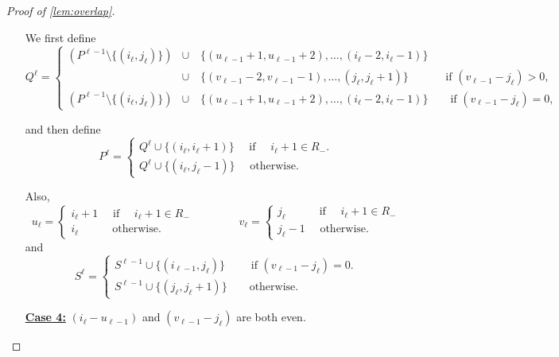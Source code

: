 \documentclass{article}
\begin{document}
\begin{proof}[Proof of \autoref{lem:overlap}]
\begin{enumerate}
        We first define
        \[
            Q^\ell = \begin{cases}
                (P^{\ell-1} \setminus \{(i_\ell, j_\ell)\}) &\cup \quad \{(u_{\ell-1}+1, u_{\ell-1}+2), \ldots, (i_\ell -2, i_\ell -1)\} \\
                &\cup \quad \{(v_{\ell-1}-2, v_{\ell-1}-1), \ldots, (j_\ell, j_\ell +1)\} 
                \qquad \quad \text{ if } (v_{\ell-1} - j_\ell) > 0, \\
                (P^{\ell-1} \setminus \{(i_\ell, j_\ell)\}) &\cup \quad \{(u_{\ell-1}+1, u_{\ell-1}+2), \ldots, (i_\ell -2, i_\ell -1)\} \qquad \text{if } (v_{\ell-1} - j_\ell) = 0,
            \end{cases}
        \]
        
        and then define
        \[
            P^\ell = \begin{cases}
                Q^\ell \cup \{(i_\ell, i_\ell +1)\} \quad \text{ if } \quad i_\ell +1 \in R_-.\\
                Q^\ell \cup \{(i_\ell, j_\ell -1)\} \quad \text{ otherwise.} 
                \end{cases} 
        \]
        
        Also,
        \[
            u_\ell = \begin{cases}
                i_\ell +1 \quad \text{ if } \quad i_\ell +1 \in R_-\\
                i_\ell \qquad \quad \text{otherwise.} 
            \end{cases} 
            \qquad \qquad 
            v_\ell = \begin{cases}
                j_\ell \qquad \quad \text{if } \quad i_\ell +1 \in R_-\\
                j_\ell -1 \quad \text{ otherwise.} 
            \end{cases} 
        \]
        and
        \[
            S^\ell = \begin{cases}
                S^{\ell -1} \cup \{(i_{\ell -1}, j_\ell)\} \qquad \text{ if } (v_{\ell -1} - j_\ell) = 0.  \\
                S^{\ell -1} \cup \{(j_\ell, j_\ell +1)\} \qquad \text{otherwise.}
            \end{cases}
        \]

        \item[\underline{\textbf{Case 4:}}]  $(i_\ell - u_{\ell-1})$ and $(v_{\ell-1} - j_\ell)$ are both even.


\end{enumerate}
\end{proof}
\end{document}
